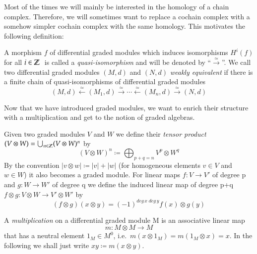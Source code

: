 Most of the times we will mainly be interested in the homology of a chain complex. Therefore, we will sometimes want to replace
a cochain complex with a somehow simpler cochain complex with the same homology. This motivates the following definition:

\begin{Definition}
 A morphism $f$ of differential graded modules which induces isomorphisms $H^i(f)$ for all $i \in \mathbb{Z} \;$ is called a
 \emph{quasi-isomorphism} and will be denoted by ``$\overset{\simeq}{\longrightarrow}$''. \newline
 We call two differential graded modules $(M,d)$ and $(N,d)$ \emph{weakly equivalent} if there is a finite chain of quasi-isomorphisms of differential
 graded modules
 $$ (M,d) \overset{\simeq}{\leftarrow} (M_1,d) \overset{\simeq}{\rightarrow} \cdots 
 \overset{\simeq}{\leftarrow} (M_n,d) \overset{\simeq}{\rightarrow} (N,d)$$
\end{Definition}


Now that we have introduced graded modules, we want to enrich their structure with a multiplication and get to 
the notion of graded algebras.

\begin{Definition}
 Given two graded modules $V$ and $W$ we define their \emph{tensor product} \newline
 ${(V \otimes W) = \bigcup_{n \in \mathbb{Z}} (V \otimes W)^n }$ by 
 $$ (V \otimes W)^n \coloneqq \bigoplus_{p + q = n} V^p \otimes W^q$$
 By the convention $|v \otimes w| \coloneqq |v| + |w|$ (for homogeneous elements $v \in V$ and $w \in W$)
 it also becomes a graded module. \newline
 For linear maps $f \colon V \to V'$ of degree p and $g \colon W \to W'$ of degree q we define the induced linear map
 of degree p+q \;  ${f \otimes g \colon V \otimes W \to V' \otimes W'}$ by
 $$ (f \otimes g) ( x \otimes y) = (-1)^{deg \, x \; deg \,y} f(x) \otimes g(y) $$

 \end{Definition}
 
 \begin{Definition}


 A \emph{multiplication} on a differential graded module M is an associative linear map
 $${m \colon M \otimes M \to M }$$ that has a neutral element $1_M \in M^0$, i.e.\ $m(x \otimes 1_M) = m(1_M \otimes x) = x$.
 In the following we shall just write $xy \coloneqq m(x \otimes y)$.
 \end{Definition}

